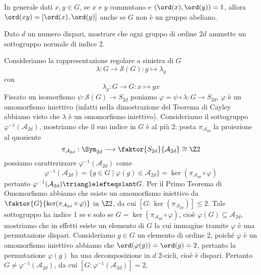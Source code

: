 \documentclass[11pt]{scrartcl}
\begin{document}
\begin{remark}
    In generale dati $x, y\in G$, se $x$ e $y$ commutano e $(\ord(x),\ord(y)) = 1$, allora 
    $\ord(xy) = [\ord(x), \ord(y)]$ anche se $G$ non è un gruppo abeliano.
\end{remark}

\begin{exercise}
    \label{ex1.48}
    Dato $d$ un numero dispari, mostrare che ogni gruppo di ordine $2d$ ammette
    un sottogruppo normale di indice 2.
\end{exercise}

\begin{soln}
    Consideriamo la rappresentazione regolare a sinistra di $G$
    \[
        \lambda: G \longrightarrow \mathcal{S}(G) : g\longmapsto \lambda_g
    \]
    con
    \[
        \lambda_g : G\longrightarrow G : x\longmapsto gx
    \]
    Fissato un isomorfismo $\psi: \mathcal{S}(G) \longrightarrow S_{2d}$ poniamo
    $\varphi = \psi\circ\lambda :G\longrightarrow S_{2d}$, $\varphi$ è 
    un omomorfismo iniettivo (infatti nella dimostrazione del Teorema di Cayley
    abbiamo visto che $\lambda$ è un omomorfismo iniettivo). Consideriamo 
    il sottogruppo $\varphi^{-1}(\mathcal{A}_{2d})$, mostriamo che il suo 
    indice in $G$ è al più 2:
    posta $\pi_{\mathcal{A}_{2d}}$ la proiezione al quoziente
    \[
        \pi_{\mathcal{A}_{2d}}:\Sym_{2d}\longrightarrow \faktor{S_{2d}}{\mathcal{A}_{2d}}\cong \Z2
    \]
    possiamo caratterizzare $\varphi^{-1}(\mathcal{A}_{2d})$ come
    \[
        \varphi^{-1}(\mathcal{A}_{2d}) = \{g \in G \mid \varphi(g) \in \mathcal{A}_{2d}\}
        = \ker (\pi_{\mathcal{A}_{2d}}\circ\varphi)
    \]
    pertanto $\varphi^{-1}(\mathcal{A}_{2d})\trianglelefteqslant G$. 
    Per il Primo Teorema di Omomorfismo abbiamo che esiste un omomorfismo
    iniettivo da $\faktor{G}{\ker(\pi_{\mathcal{A}_{2d}}\circ\varphi)}$ in
    $\Z2$, da cui $[G:\ker(\pi_{\mathcal{A}_{2d}})] \leq 2$. Tale 
    sottogruppo ha indice 1 se e solo se $G = \ker(\pi_{\mathcal{A}_{2d}}\circ\varphi)$,
    cioè $\varphi(G) \subseteq \mathcal{A}_{2d}$, mostriamo che in effetti esiste 
    un elemento di $G$ la cui immagine tramite $\varphi$ è una permutazione 
    dispari. Consideriamo $g \in G$ un elemento di ordine 2, poiché $\varphi$
    è un omomorfismo iniettivo abbiamo che $\ord(\varphi(g)) = \ord(g) = 2$,
    pertanto la permutazione $\varphi(g)$ ha una decomposizione in $d$ 2-cicli,
    cioè è dispari. Pertanto $G \neq \varphi^{-1}(\mathcal{A}_{2d})$,
    da cui $[G: \varphi^{-1}(\mathcal{A}_{2d})] = 2$,
\end{soln}
\end{document}
